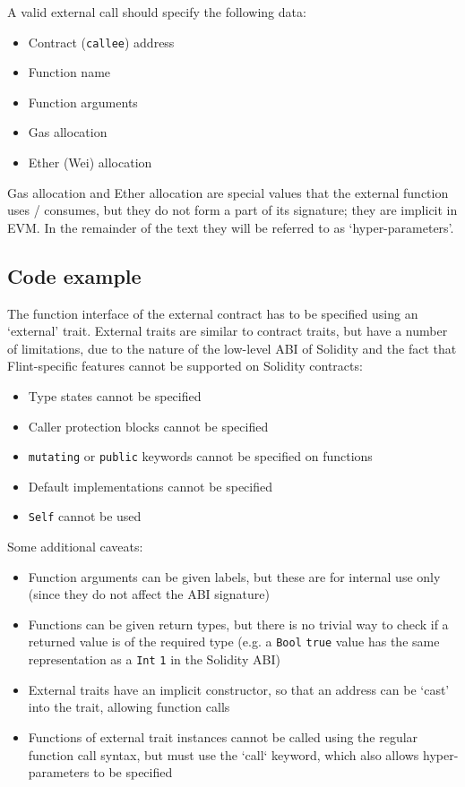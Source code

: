 A valid external call should specify the following data:

\begin{itemize}
	\item Contract (\texttt{callee}) address
	\item Function name
	\item Function arguments
	\item Gas allocation
	\item Ether (Wei) allocation
\end{itemize}

Gas allocation and Ether allocation are special values that the external function uses / consumes, but they do not form a part of its signature; they are implicit in EVM. In the remainder of the text they will be referred to as `hyper-parameters'.

\subsection{Code example}

The function interface of the external contract has to be specified using an `external' trait. External traits are similar to contract traits, but have a number of limitations, due to the nature of the low-level ABI of Solidity and the fact that Flint-specific features cannot be supported on Solidity contracts:

\begin{itemize}
	\item Type states cannot be specified
	\item Caller protection blocks cannot be specified
	\item \texttt{mutating} or \texttt{public} keywords cannot be specified on functions
	\item Default implementations cannot be specified
	\item \texttt{Self} cannot be used
\end{itemize}

Some additional caveats:

\begin{itemize}
	\item Function arguments can be given labels, but these are for internal use only (since they do not affect the ABI signature)
	\item Functions can be given return types, but there is no trivial way to check if a returned value is of the required type (e.g. a \texttt{Bool} \texttt{true} value has the same representation as a \texttt{Int} \texttt{1} in the Solidity ABI)
	\item External traits have an implicit constructor, so that an address can be `cast' into the trait, allowing function calls
	\item Functions of external trait instances cannot be called using the regular function call syntax, but must use the `call` keyword, which also allows hyper-parameters to be specified
\end{itemize}

